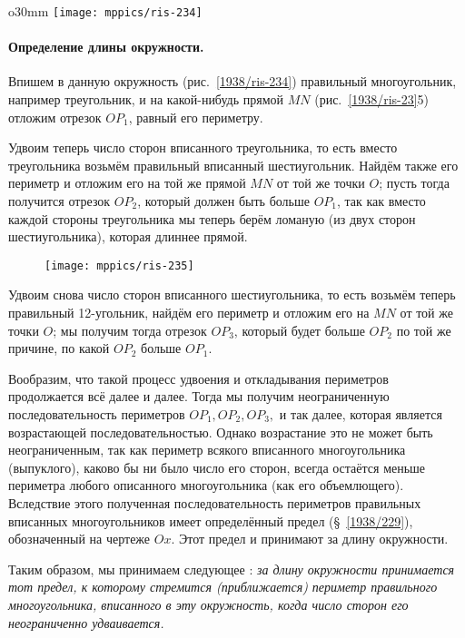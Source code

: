 \begin{wrapfigure}{o}{30mm}
\centering
\texttt{[image: mppics/ris-234]}
\caption{}\label{1938/ris-234}
\end{wrapfigure}

\paragraph{Определение длины окружности.}\label{1938/234}
Впишем в данную окружность (рис.~\ref{1938/ris-234}) правильный многоугольник, например треугольник, и на какой-нибудь прямой $MN$ (рис.~\ref{1938/ris-23}5) отложим отрезок $OP_1$, равный его периметру.

Удвоим теперь число сторон вписанного треугольника, то есть
вместо треугольника возьмём правильный вписанный шестиугольник.
Найдём также его периметр и отложим его на той же прямой $MN$ от той же точки $O$;
пусть тогда получится отрезок $OP_2$, который должен быть больше $OP_1$, так как вместо каждой стороны треугольника мы теперь берём ломаную (из двух сторон шестиугольника), которая длиннее прямой.

\begin{figure}[h!]
\centering
\texttt{[image: mppics/ris-235]}
\caption{}\label{1938/ris-235}
\end{figure}

Удвоим снова число сторон вписанного шестиугольника, то есть возьмём теперь правильный 12-угольник, найдём его периметр и отложим его на $MN$ от той же точки $O$; 
мы получим тогда отрезок $OP_3$, который будет больше $OP_2$ по той же причине, по какой $OP_2$ больше $OP_1$.

Вообразим, что такой процесс удвоения и откладывания периметров продолжается всё далее и далее.
Тогда мы получим неограниченную последовательность периметров $OP_1, OP_2, OP_3,$ и так далее, которая является возрастающей последовательностью.
Однако возрастание это не может быть неограниченным, так как периметр всякого вписанного многоугольника (выпуклого), каково бы ни было число его сторон, всегда остаётся меньше периметра любого описанного многоугольника (как его объемлющего).
Вследствие этого полученная последовательность периметров правильных вписанных многоугольников имеет определённый предел (§~\ref{1938/229}), обозначенный на чертеже $Ox$.
Этот предел и принимают за длину окружности.

Таким образом, мы принимаем следующее :
\emph{за длину окружности принимается тот предел, к которому стремится (приближается) периметр правильного многоугольника, вписанного в эту окружность, когда число сторон его неограниченно удваивается.}

